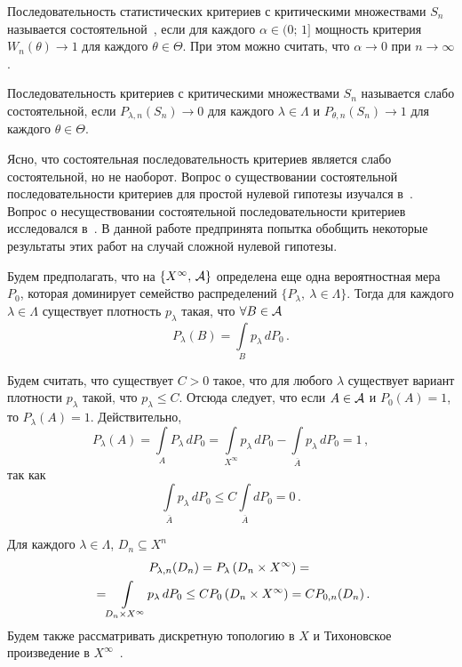\begin{multicols}{2}
    Последовательность статистических критериев с критическими 
множествами $S_n$ называется состоятельной~\cite{3gr}, если для каждого 
$\alpha \in (0;\,1]$ мощность критерия $W_n(\theta )\rightarrow 1$ для каждого 
$\theta\in\Theta$. При этом можно считать, что $\alpha\rightarrow 0$ при 
$n\rightarrow\infty$.
    
    Последовательность критериев с критическими множествами $S_n$ 
называется слабо состоятельной, если $P_{\lambda,n}(S_n)\rightarrow 0$ для 
каждого $\lambda\in\Lambda$  и $P_{\theta,n}(S_n)\rightarrow 1$ для каждого 
$\theta\in\Theta$.
    
    Ясно, что состоятельная последовательность критериев является слабо 
состоятельной, но не наоборот. Вопрос о существовании состоятельной 
последовательности критериев для простой нулевой гипотезы изучался 
в~\cite{1gr}. Вопрос о несуществовании состоятельной последовательности 
критериев исследовался в~\cite{6gr, 2gr}. В данной работе предпринята 
попытка обобщить некоторые результаты этих работ на случай сложной 
нулевой гипотезы. 
    
    Будем предполагать, что на $\{X^\infty,\,\cal{A}\}$ определена еще одна 
вероятностная мера $P_0$, которая доминирует семейство распределений 
$\{P_\lambda ,\ \lambda\in\Lambda\}$. Тогда для каждого $\lambda\in\Lambda$ 
существует плотность $p_\lambda$ такая, что $\forall B\in \cal{A}$
    $$
    P_\lambda (B) = \int\limits_B p_\lambda\,dP_0\,.
    $$
    
    Будем считать, что существует $C>0$ такое, что для любого $\lambda$ 
существует вариант плотности $p_\lambda$ такой, что $p_\lambda \leq C$. Отсюда 
следует, что если $A\in \cal{A}$ и $P_0 (A)=1$, то $P_\lambda (A)=1$. 
Действительно,
    $$
    P_\lambda (A) = \int\limits_A P_\lambda\,dP_0 = 
\int\limits_{X^\infty}p_\lambda\,dP_0 -\int\limits_{\overline{A}} p_\lambda\,dP_0 
=1\,,
    $$
так как
$$
\int\limits_{\overline{A}} p_\lambda\,dP_0\leq 
C\int\limits_{\overline{A}}dP_0=0\,.
$$

    Для каждого $\lambda\in\Lambda$, $D_n\subseteq X^n$
\begin{multline*}
    P_{\lambda,n} (D_n) = P_\lambda \left ( D_n\times X^\infty \right ) = {}\\
    {}=
\!\int\limits_{D_n\times X^\infty}\! p_\lambda\,dP_0\leq CP_0\left ( D_n\times 
X^\infty\right ) =
    C P_{0,n}(D_n)\,.\hspace*{-1.038pt}
    \end{multline*}
Будем также рассматривать дискретную топологию в $X$ и Тихоновское 
произведение в $X^\infty$~\cite{4gr}. 


\end{multicols}
